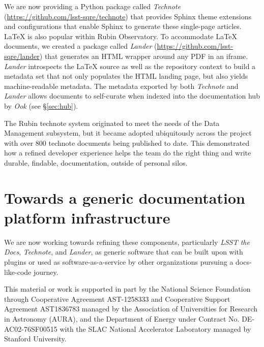 \documentclass[11pt,twoside]{article}
\begin{document}
We are now providing a Python package called \textit{Technote} (\url{https://github.com/lsst-sqre/technote}) that provides Sphinx theme extensions and configurations that enable Sphinx to generate these single-page articles.
LaTeX is also popular within Rubin Observatory.
To accommodate LaTeX documents, we created a package called \textit{Lander} (\url{https://github.com/lsst-sqre/lander}) that generates an HTML wrapper around any PDF in an iframe.
\textit{Lander} introspects the LaTeX source as well as the repository context to build a metadata set that not only populates the HTML landing page, but also yields machine-readable metadata.
The metadata exported by both \textit{Technote} and \textit{Lander} allows documents to self-curate when indexed into the documentation hub by \textit{Ook} (see \S\ref{sec:hub}).

The Rubin technote system originated to meet the needs of the Data Management subsystem, but it became adopted ubiquitously across the project with over 800 technote documents being published to date.
This demonstrated how a refined developer experience helps the team do the right thing and write durable, findable, documentation, outside of personal silos.

\section{Towards a generic documentation platform infrastructure}

We are now working towards refining these components, particularly \textit{LSST the Docs}, \textit{Technote}, and \textit{Lander}, as generic software that can be built upon with plugins or used as software-as-a-service by other organizations pursuing a docs-like-code journey.

\acknowledgements This material or work is supported in part by the National Science Foundation through Cooperative Agreement AST-1258333 and Cooperative Support Agreement AST1836783 managed by the Association of Universities for Research in Astronomy (AURA), and the Department of Energy under Contract No. DE-AC02-76SF00515 with the SLAC National Accelerator Laboratory managed by Stanford University.



\end{document}
